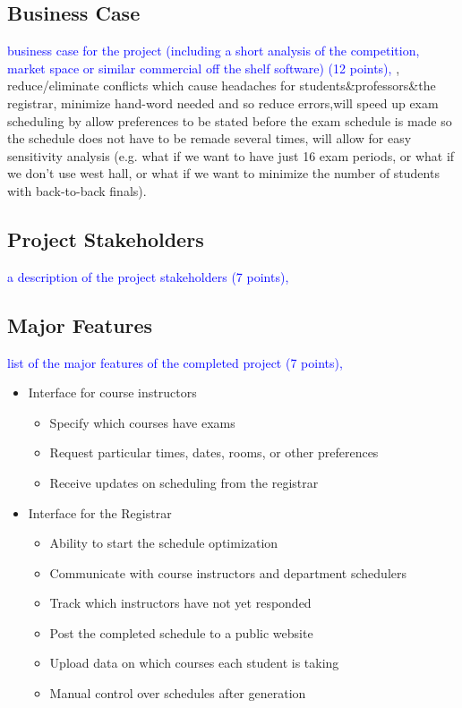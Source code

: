 \documentclass[11pt]{article}
\begin{document}
\subsection{Business Case} %
\textcolor{blue}{ business case for the project (including a short analysis of the
 competition, market space or similar commercial off the shelf software) (12 points),}
, reduce/eliminate conflicts which cause headaches for students\&professors\&the registrar, minimize hand-word needed and so reduce errors,will speed up exam scheduling by allow preferences to be stated before the exam schedule is made so the schedule does not have to be remade several times, will allow for easy sensitivity analysis (e.g. what if we want to have just 16 exam periods, or what if we don't use west hall, or what if we want to minimize the number of students with back-to-back finals).
\subsection{Project Stakeholders} %
\textcolor{blue}{a description of the project stakeholders (7 points),}
\subsection{Major Features} %
\textcolor{blue}{ list of the major features of the completed project (7 points),}
\begin{itemize}
  \item Interface for course instructors
  \begin{itemize}
    \item Specify which courses have exams
    \item Request particular times, dates, rooms, or other preferences
    \item Receive updates on scheduling from the registrar
  \end{itemize}
  \item Interface for the Registrar
  \begin{itemize}
    \item Ability to start the schedule optimization
    \item Communicate with course instructors and department schedulers
    \item Track which instructors have not yet responded
    \item Post the completed schedule to a public website
    \item Upload data on which courses each student is taking %
    \item Manual control over schedules after generation
  \end{itemize}
\end{itemize}
\end{document}

